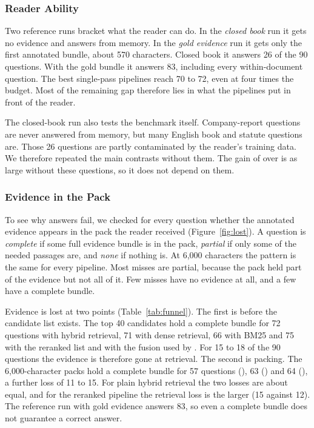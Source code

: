 \subsubsection{Reader Ability}
Two reference runs bracket what the reader can do. In the \emph{closed book} run it gets no evidence and answers from memory. In the \emph{gold evidence} run it gets only the first annotated bundle, about 570 characters. Closed book it answers 26 of the 90 questions. With the gold bundle it answers 83, including every within-document question. The best single-pass pipelines reach 70 to 72, even at four times the budget. Most of the remaining gap therefore lies in what the pipelines put in front of the reader.

The closed-book run also tests the benchmark itself. Company-report questions are never answered from memory, but many English book and statute questions are. Those 26 questions are partly contaminated by the reader's training data. We therefore repeated the main contrasts without them. The gain of \lexb{} over \hybrid{} is as large without these questions, so it does not depend on them.

\subsubsection{Evidence in the Pack}

To see why answers fail, we checked for every question whether the annotated evidence appears in the pack the reader received (Figure~\ref{fig:lost}). A question is \emph{complete} if some full evidence bundle is in the pack, \emph{partial} if only some of the needed passages are, and \emph{none} if nothing is. At 6,000 characters the pattern is the same for every pipeline. Most misses are partial, because the pack held part of the evidence but not all of it. Few misses have no evidence at all, and a few have a complete bundle.

Evidence is lost at two points (Table~\ref{tab:funnel}). The first is before the candidate list exists. The top 40 candidates hold a complete bundle for 72 questions with hybrid retrieval, 71 with dense retrieval, 66 with BM25 and 75 with the reranked list and with the fusion used by \lexb. For 15 to 18 of the 90 questions the evidence is therefore gone at retrieval. The second is packing. The 6,000-character packs hold a complete bundle for 57 questions (\hybrid), 63 (\hr) and 64 (\lexb), a further loss of 11 to 15. For plain hybrid retrieval the two losses are about equal, and for the reranked pipeline the retrieval loss is the larger (15 against 12). The reference run with gold evidence answers 83, so even a complete bundle does not guarantee a correct answer.


